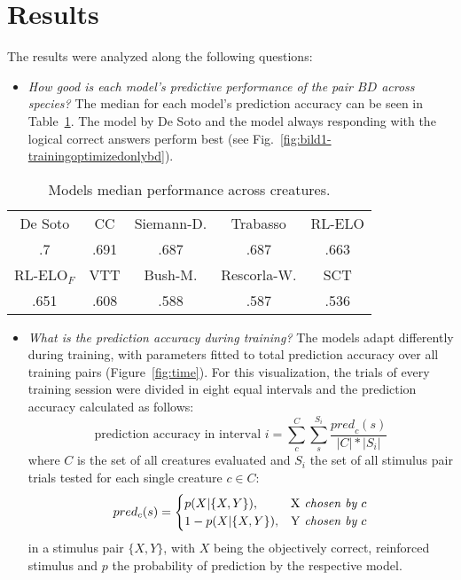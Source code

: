 \documentclass[10pt,letterpaper]{article}
\begin{document}
	\section{Results}
	The results were analyzed along the following questions:
	\begin{itemize}
		\item \emph{How good is each model's predictive performance of the pair $BD$ across species?} The median for each model's prediction accuracy can be seen in Table~\ref{tab}. The model by De Soto and the model always responding with the logical correct answers perform best (see Fig.~\ref{fig:bild1-trainingoptimizedonlybd}). 
	\end{itemize}
	\begin{table}
		\caption{Models median performance across creatures.}
		\label{tab}
		\def\arraystretch{.9}
		\setlength{\tabcolsep}{4pt}
		\begin{tabular}{ccccc}
			\toprule
			De Soto & CC &Siemann-D. & Trabasso & RL-ELO \\ 
			.7 & .691 &.687 & .687 & .663 \\ 
			\midrule
			RL-ELO$_F$ & VTT & Bush-M.& Rescorla-W. & SCT \\ 
			.651 &  .608 & .588 & .587 & .536 \\ 
			\bottomrule
		\end{tabular}
	\end{table}
	
	
	\begin{itemize}
		
		\item \emph{What is the prediction accuracy during training?} The models adapt differently  during training, with parameters fitted to total prediction accuracy over all training pairs (Figure~\ref{fig:time}). For this visualization, the trials of every training session were divided in eight equal intervals and the prediction accuracy calculated as follows:
		\begin{equation*}
		\text{prediction accuracy in interval } i = \sum_{c}^{C}\sum_s ^{S_i}\frac{\textit{pred}_c(s)}{|C|*|S_i|}
		\end{equation*}
		where $C$ is the set of all creatures evaluated and $S_i$ the set of all stimulus pair trials tested for each single creature $c \in C$:
		\begin{equation*}
		pred_c(s) = 
		\begin{cases}
		p(X|\{X,Y\})
		, & $X$ \textit{ chosen by } c\\
		1-p(X|\{X,Y\})
		, & $Y$ \textit{ chosen by } c
		\end{cases}
		\end{equation*}
		in a stimulus pair $\{X,Y\}$, with $X$ being the objectively correct, reinforced stimulus and $p$ the probability of prediction by the respective model.
	\end{itemize}
	
\end{document}
